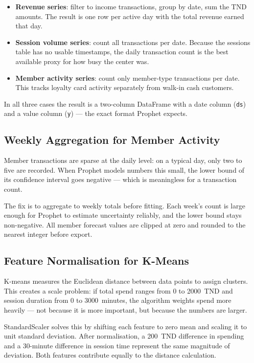 \begin{itemize}
  \item \textbf{Revenue series}: filter to income transactions, group by date, sum the
        TND amounts. The result is one row per active day with the total revenue
        earned that day.
  \item \textbf{Session volume series}: count all transactions per date. Because the
        sessions table has no usable timestamps, the daily transaction count is the
        best available proxy for how busy the center was.
  \item \textbf{Member activity series}: count only member-type transactions per date.
        This tracks loyalty card activity separately from walk-in cash customers.
\end{itemize}

In all three cases the result is a two-column DataFrame with a date column
(\texttt{ds}) and a value column (\texttt{y}) --- the exact format Prophet expects.

\subsection{Weekly Aggregation for Member Activity}

Member transactions are sparse at the daily level: on a typical day, only two to five
are recorded. When Prophet models numbers this small, the lower bound of its confidence
interval goes negative --- which is meaningless for a transaction count.

The fix is to aggregate to weekly totals before fitting. Each week's count is large
enough for Prophet to estimate uncertainty reliably, and the lower bound stays
non-negative. All member forecast values are clipped at zero and rounded to the
nearest integer before export.

\subsection{Feature Normalisation for K-Means}

K-means measures the Euclidean distance between data points to assign clusters. This
creates a scale problem: if total spend ranges from 0 to 2000~TND and session duration
from 0 to 3000~minutes, the algorithm weights spend more heavily --- not because it
is more important, but because the numbers are larger.

StandardScaler solves this by shifting each feature to zero mean and scaling it to
unit standard deviation. After normalisation, a 200~TND difference in spending and a
30-minute difference in session time represent the same magnitude of deviation. Both
features contribute equally to the distance calculation.

